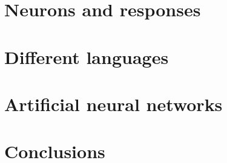 
\section{Neurons and responses}


\section{Different languages}

\section{Artificial neural networks}

\section{Conclusions}
